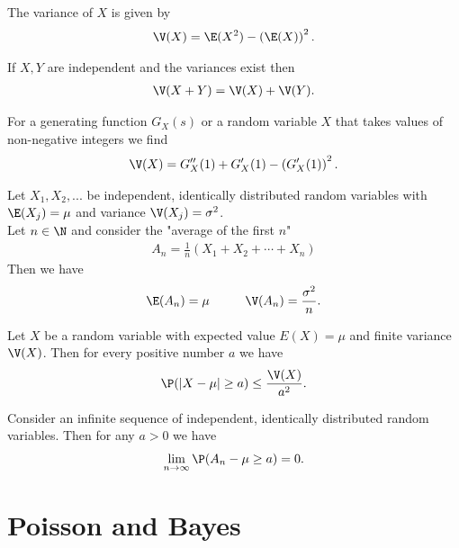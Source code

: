 \documentclass{article}
\begin{document}
\begin{theorem}
	The variance of $X$ is given by
	\begin{align*}
		\V(X) = \E(X^2) - \left(\E(X)\right)^2.
	\end{align*}
\end{theorem}
\begin{theorem}
	If $X,Y$ are independent and the variances exist then
	\begin{align*}
		\V(X+Y) = \V(X) + \V(Y).
	\end{align*}
\end{theorem}
\begin{lemma}
	For a generating function $G_X(s)$ or a random variable
	$X$ that takes values of non-negative integers
	we find
	\begin{align*}
		\V(X) = G''_X(1) + G'_X(1) - \left(G'_X(1)\right)^2.
	\end{align*}
\end{lemma}
\begin{theorem}
	Let $X_1, X_2, ...$ be independent, identically
	distributed random variables with $\E(X_j)=\mu$
	and variance $\V(X_j)=\sigma^2$.\\
	Let $n\in\N$ and consider the "average of the first $n$"
	\begin{align*}
		A_n = \frac{1}{n}\left(X_1 + X_2 + \cdots + X_n\right)
	\end{align*}
	Then we have
	\begin{align*}
		\E(A_n) = \mu\hspace{1cm} \V(A_n) = \frac{\sigma^2}{n}.
	\end{align*}
\end{theorem}
\begin{theorem}
	Let $X$ be a random variable with expected value $E(X)=\mu$
	and finite variance $\V(X)$. Then for every positive number
	$a$ we have
	\begin{align*}
		\P(|X-\mu|\geq a) \leq \frac{\V(X)}{a^2}.
	\end{align*}
\end{theorem}
\begin{theorem}
	Consider an infinite sequence of independent, identically
	distributed random variables. Then for any $a>0$ we have
	\begin{align*}
		\lim_{n\to\infty}\P(A_n - \mu \geq a) = 0.
	\end{align*}
\end{theorem}
\section{Poisson and Bayes}
\end{document}
